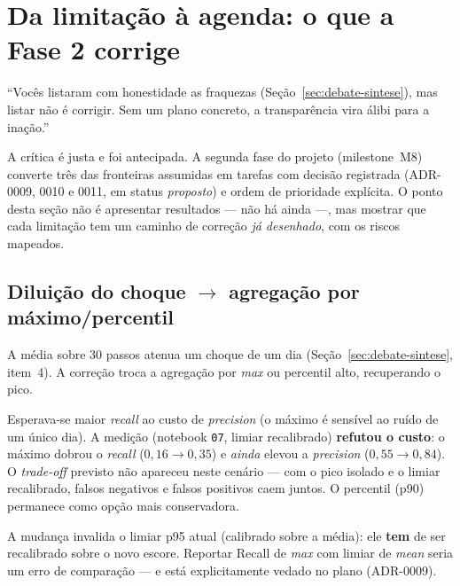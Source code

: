 \section{Da limitação à agenda: o que a Fase 2 corrige}
\label{sec:debate-fase2}

\begin{confronto}
``Vocês listaram com honestidade as fraquezas (Seção~\ref{sec:debate-sintese}), mas listar não é
corrigir. Sem um plano concreto, a transparência vira álibi para a inação.''
\end{confronto}

A crítica é justa e foi antecipada. A segunda fase do projeto (milestone~M8) converte três das
fronteiras assumidas em tarefas com decisão registrada (ADR-0009, 0010 e 0011, em status
\emph{proposto}) e ordem de prioridade explícita. O ponto desta seção não é apresentar
resultados --- não há ainda ---, mas mostrar que cada limitação tem um caminho de correção
\emph{já desenhado}, com os riscos mapeados.

\subsection{Diluição do choque $\to$ agregação por máximo/percentil}
\label{sec:debate-fase2-pooling}
A média sobre 30 passos atenua um choque de um dia (Seção~\ref{sec:debate-sintese}, item~4). A
correção troca a agregação por \emph{max} ou percentil alto, recuperando o pico.
\begin{tradeoff}
Esperava-se maior \emph{recall} ao custo de \emph{precision} (o máximo é sensível ao ruído de um
único dia). A medição (notebook \texttt{07}, limiar recalibrado) \textbf{refutou o custo}: o
máximo dobrou o \emph{recall} ($0{,}16 \to 0{,}35$) e \emph{ainda} elevou a \emph{precision}
($0{,}55 \to 0{,}84$). O \emph{trade-off} previsto não apareceu neste cenário --- com o pico
isolado e o limiar recalibrado, falsos negativos e falsos positivos caem juntos. O percentil
(p90) permanece como opção mais conservadora.
\end{tradeoff}
\begin{honesto}
A mudança invalida o limiar p95 atual (calibrado sobre a média): ele \textbf{tem} de ser
recalibrado sobre o novo escore. Reportar Recall de \emph{max} com limiar de \emph{mean} seria um
erro de comparação --- e está explicitamente vedado no plano (ADR-0009).
\end{honesto}

